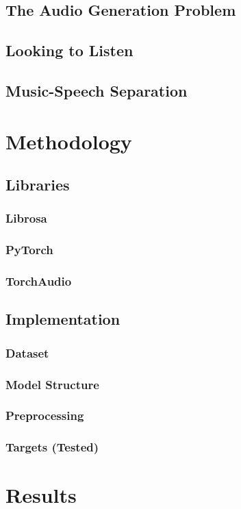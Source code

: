 \documentclass{book}
\begin{document}
\chapter{The Audio Generation Problem}
\chapter{Looking to Listen}
\chapter{Music-Speech Separation}

\part{Methodology}
\chapter{Libraries}
\section{Librosa}
\section{PyTorch}
\section{TorchAudio}
\chapter{Implementation}
\section{Dataset}
\section{Model Structure}
\section{Preprocessing}
\section{Targets (Tested)}


\part{Results}
\end{document}
